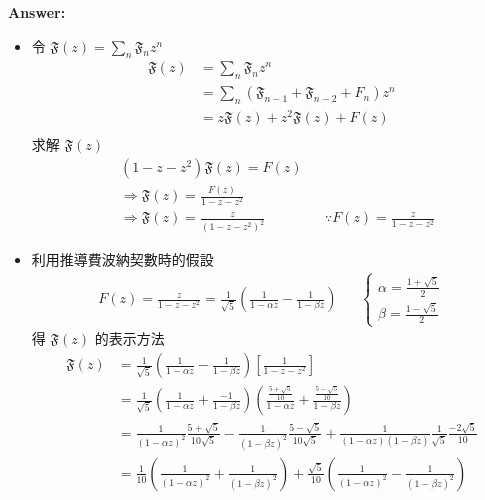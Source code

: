 \documentclass[11pt,fleqn]{article}
\renewcommand\part[1]{\vspace{.10in}\textbf{#1}}
\begin{document}
\part{Answer:}

\begin{itemize}
	\item 令 $\mathfrak{F}(z) = \sum_n \mathfrak{F}_n z^n$
		\begin{align*}
		\mathfrak{F}(z) &= \sum_n \mathfrak{F}_n z^n \\
			&= \sum_n (\mathfrak{F}_{n-1}+\mathfrak{F}_{n-2}+F_n) z^n \\
			&= z \mathfrak{F}(z) + z^2 \mathfrak{F}(z) + F(z) \\
		\end{align*}
		求解 $\mathfrak{F}(z)$
		\begin{align*}
		&(1 - z - z^2) \mathfrak{F}(z) = F(z) \\
		&\Rightarrow \mathfrak{F}(z) = \frac{F(z)}{1 - z - z^2} \\
		&\Rightarrow \mathfrak{F}(z) = \frac{z}{(1 - z - z^2)^2} 
			&& \because F(z) = \frac{z}{1-z-z^2}
		\end{align*}
	\item 利用推導費波納契數時的假設 
		\begin{align*}
			F(z)=\frac{z}{1-z-z^2} = \frac{1}{\sqrt{5}} \left(\frac{1}{1- \alpha z} - \frac{1}{1- \beta z}\right) && \left\{\begin{matrix}\alpha = \frac{1+\sqrt{5}}{2}\\ \beta = \frac{1-\sqrt{5}}{2}\end{matrix}\right.
		\end{align*}
		得 $\mathfrak{F}(z)$ 的表示方法
		\begin{align*}
			\mathfrak{F}(z) &= \frac{1}{\sqrt{5}} \left(\frac{1}{1- \alpha z} - \frac{1}{1- \beta z}\right) \left[ \frac{1}{1-z-z^2} \right] \\
				&= \frac{1}{\sqrt{5}} \left(\frac{1}{1- \alpha z} + \frac{-1}{1- \beta z}\right) 
					\left( \frac{\frac{5+\sqrt{5}}{10}}{1-\alpha z} + 
						\frac{\frac{5-\sqrt{5}}{10}}{1-\beta z} \right) \\
				&= \frac{1}{(1-\alpha z)^2} \frac{5 + \sqrt{5}}{10\sqrt{5}} 
					- \frac{1}{(1-\beta z)^2} \frac{5 - \sqrt{5}}{10\sqrt{5}} 
					+ \frac{1}{(1-\alpha z)(1-\beta z)} \frac{1}{\sqrt{5}} \frac{-2\sqrt{5}}{10}
					\\
				&= \frac{1}{10} \left( \frac{1}{(1-\alpha z)^2} + \frac{1}{(1-\beta z)^2}\right)
					+ \frac{\sqrt{5}}{10} \left( \frac{1}{(1-\alpha z)^2} - \frac{1}{(1-\beta z)^2}\right)

\end{align*}
\end{itemize}
\end{document}
